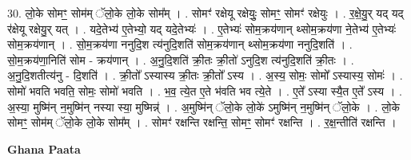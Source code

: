 \documentclass[17pt]{extarticle}
\begin{document}
30. लो॒के सोमꣳ॒॒ सोम॑म् ॅलो॒के लो॒के सोम᳚म् । . सोमꣳ॑ रक्षेयू रक्षेयुः॒ सोमꣳ॒॒ सोमꣳ॑ रक्षेयुः । . र॒क्षे॒यु॒र् यद् यद् र॑क्षेयू रक्षेयु॒र् यत् । . यदे॒तेभ्य॑ ए॒तेभ्यो॒ यद् यदे॒तेभ्यः॑ । . ए॒तेभ्यः॑ सोम॒क्रय॑णान् थ्सोम॒क्रय॑णा ने॒तेभ्य॑ ए॒तेभ्यः॑ सोम॒क्रय॑णान् । . सो॒म॒क्रय॑णा ननुदि॒श त्य॑नुदि॒शति॑ सोम॒क्रय॑णान् थ्सोम॒क्रय॑णा ननुदि॒शति॑ । . सो॒म॒क्रय॑णा॒निति॑ सोम - क्रय॑णान् । . अ॒नु॒दि॒शति॑ क्री॒तः क्री॒तो॑ ऽनुदि॒श त्य॑नुदि॒शति॑ क्री॒तः । . अ॒नु॒दि॒शतीत्य॑नु - दि॒शति॑ । . क्री॒तो᳚ ऽस्यास्य क्री॒तः क्री॒तो᳚ ऽस्य । . अ॒स्य॒ सोमः॒ सोमो᳚ ऽस्यास्य॒ सोमः॑ । . सोमो॑ भवति भवति॒ सोमः॒ सोमो॑ भवति । . भ॒व॒ त्ये॒त ए॒ते भ॑वति भव त्ये॒ते । . ए॒ते᳚ ऽस्या स्यै॒त ए॒ते᳚ ऽस्य । . अ॒स्या॒ मुष्मि॑न् न॒मुष्मि॑न् नस्या स्या॒ मुष्मिन्न्॑ । . अ॒मुष्मि॑न् ॅलो॒के लो॒के॑ ऽमुष्मि॑न् न॒मुष्मि॑न् ॅलो॒के । . लो॒के सोमꣳ॒॒ सोम॑म् ॅलो॒के लो॒के सोम᳚म् । . सोमꣳ॑ रक्षन्ति रक्षन्ति॒ सोमꣳ॒॒ सोमꣳ॑ रक्षन्ति । . र॒क्ष॒न्तीति॑ रक्षन्ति । \newline

\textbf{Ghana Paata } \newline
\end{document}

